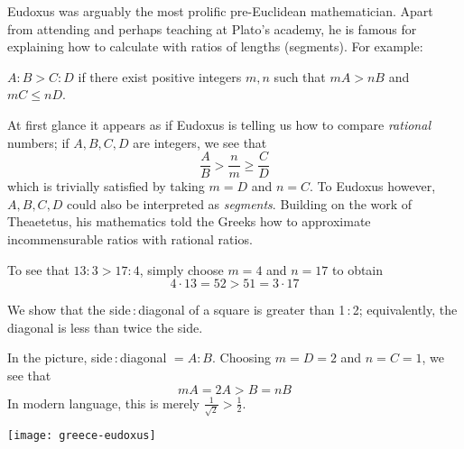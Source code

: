 \label{pg:eudoxus}

Eudoxus was arguably the most prolific pre-Euclidean mathematician. Apart from attending and perhaps teaching at Plato's academy, he is famous for explaining how to calculate with ratios of lengths (segments). For example:

\begin{defn*}{}{}
	$A:B>C:D$ if there exist positive integers $m,n$ such that $mA>nB$ and $mC\le nD$.
\end{defn*}

At first glance it appears as if Eudoxus is telling us how to compare \emph{rational} numbers; if $A,B,C,D$ are integers, we see that
\[
	\frac AB>\frac nm\ge \frac CD
\]
which is trivially satisfied by taking $m=D$ and $n=C$. To Eudoxus however, $A,B,C,D$ could also be interpreted as \emph{segments}. Building on the work of Theaetetus, his mathematics told the Greeks how to approximate incommensurable ratios with rational ratios.


\exstart To see that $13:3>17:4$, simply choose $m=4$ and $n=17$ to obtain
  \[
  	4\cdot 13=52>51=3\cdot 17
  \]

\begin{enumerate}\setcounter{enumi}{1}
  \begin{minipage}[t]{0.68\linewidth}\vspace{-10pt}
    \item We show that the side\,:\,diagonal of a square is greater than 1\,:\,2; equivalently, the diagonal is less than twice the side.\par
    In the picture, side\,:\,diagonal $=A:B$. Choosing $m=D=2$ and $n=C=1$, we see that
  	\[
  		mA=2A>B=nB \tag{diag $>$ side of large square}
  	\]
  	In modern language, this is merely $\frac 1{\sqrt 2}>\frac 12$.
  \end{minipage}
  \hfill
  \begin{minipage}[t]{0.31\linewidth}\vspace{-10pt}
  	\flushright
  	\texttt{[image: greece-eudoxus]}
  \end{minipage}
\end{enumerate}


\label{pg:zeno}

